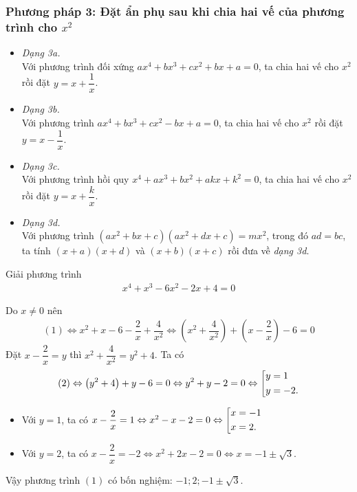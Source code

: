 	\subsubsection{Phương pháp 3: Đặt ẩn phụ sau khi chia hai vế của phương trình cho $x^2$}
		\begin{itemize}
			\item \textit{Dạng 3a.} \\
				Với phương trình đối xứng $ax^4 + bx^3 + cx^2 + bx + a = 0$, ta chia hai vế cho $x^2$ rồi đặt $y = x + \dfrac{1}{x}$.
			\item \textit{Dạng 3b.} \\
				Với phương trình $ax^4 + bx^3 + cx^2 - bx + a =0$, ta chia hai vế cho $x^2$ rồi đặt $y = x - \dfrac{1}{x}$.
			\item \textit{Dạng 3c.} \\
				Với phương trình hồi quy $x^4 + ax^3 + bx^2 + akx + k^2 = 0$, ta chia hai vế cho $x^2$ rồi đặt $y = x + \dfrac{k}{x}$.
			\item \textit{Dạng 3d.} \\
				Với phương trình $\left(ax^2+bx+c\right)\left(ax^2+dx+c\right)=mx^2$, trong đó $ad=bc$, ta tính $(x+a)(x+d)$ và $(x+b)(x+c)$ rồi đưa về \emph{dạng 3d}.
		\end{itemize}
		\begin{vd}
			Giải phương trình
			\begin{align*}
				x^4+x^3-6x^2-2x+4=0 \tag{1}
			\end{align*}
			\loigiai 
			{
				Do $x \ne 0$ nên
				\begin{align*}
					(1) \Leftrightarrow x^2 + x -6 - \dfrac{2}{x} + \dfrac{4}{x^2} \Leftrightarrow \left(x^2 + \dfrac{4}{x^2}\right) + \left(x - \dfrac{2}{x}\right) - 6 = 0 \tag{2}
				\end{align*}
				Đặt $x - \dfrac{2}{x} = y$ thì $x^2 + \dfrac{4}{x^2} = y^2 + 4$. Ta có
				$$(2) \Leftrightarrow \left(y^2 + 4\right) + y -6 = 0 \Leftrightarrow y^2 + y - 2 = 0 \Leftrightarrow \left[\begin{aligned}&y=1 \\ &y=-2.\end{aligned}\right.$$
				\begin{itemize}
					\item Với $y=1$, ta có $x - \dfrac{2}{x} = 1 \Leftrightarrow x^2-x-2=0 \Leftrightarrow \left[\begin{aligned}&x=-1 \\ &x=2.\end{aligned}\right.$
					\item Với $y = 2$, ta có $x - \dfrac{2}{x} = -2 \Leftrightarrow x^2 + 2x - 2 = 0 \Leftrightarrow x = -1 \pm \sqrt{3}$.
				\end{itemize}
				Vậy phương trình $(1)$ có bốn nghiệm: $-1;2;-1 \pm \sqrt{3}$.
			}
		\end{vd}
		
